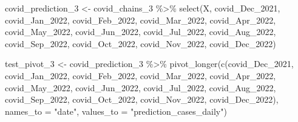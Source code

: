 \documentclass[
]{book}
\newenvironment{Shaded}{\begin{snugshade}}{\end{snugshade}}
\newcommand{\AttributeTok}[1]{\textcolor[rgb]{0.77,0.63,0.00}{#1}}
\newcommand{\FunctionTok}[1]{\textcolor[rgb]{0.00,0.00,0.00}{#1}}
\newcommand{\NormalTok}[1]{#1}
\newcommand{\OtherTok}[1]{\textcolor[rgb]{0.56,0.35,0.01}{#1}}
\newcommand{\SpecialCharTok}[1]{\textcolor[rgb]{0.00,0.00,0.00}{#1}}
\newcommand{\StringTok}[1]{\textcolor[rgb]{0.31,0.60,0.02}{#1}}
\begin{document}
\begin{Shaded}
\begin{Highlighting}[]
\NormalTok{covid\_prediction\_3 }\OtherTok{\textless{}{-}}\NormalTok{ covid\_chains\_3 }\SpecialCharTok{\%\textgreater{}\%}
  \FunctionTok{select}\NormalTok{(X, covid\_Dec\_2021, covid\_Jan\_2022, covid\_Feb\_2022, covid\_Mar\_2022, covid\_Apr\_2022, covid\_May\_2022, covid\_Jun\_2022, covid\_Jul\_2022, covid\_Aug\_2022, covid\_Sep\_2022, covid\_Oct\_2022, covid\_Nov\_2022, covid\_Dec\_2022)}
\end{Highlighting}
\end{Shaded}

\begin{Shaded}
\begin{Highlighting}[]
\NormalTok{test\_pivot\_3 }\OtherTok{\textless{}{-}}\NormalTok{ covid\_prediction\_3 }\SpecialCharTok{\%\textgreater{}\%}
  \FunctionTok{pivot\_longer}\NormalTok{(}\FunctionTok{c}\NormalTok{(covid\_Dec\_2021, covid\_Jan\_2022, covid\_Feb\_2022, covid\_Mar\_2022, covid\_Apr\_2022, covid\_May\_2022, covid\_Jun\_2022, covid\_Jul\_2022, covid\_Aug\_2022, covid\_Sep\_2022, covid\_Oct\_2022, covid\_Nov\_2022, covid\_Dec\_2022), }\AttributeTok{names\_to =} \StringTok{"date"}\NormalTok{, }\AttributeTok{values\_to =} \StringTok{"prediction\_cases\_daily"}\NormalTok{)}


\end{Highlighting}
\end{Shaded}
\end{document}
